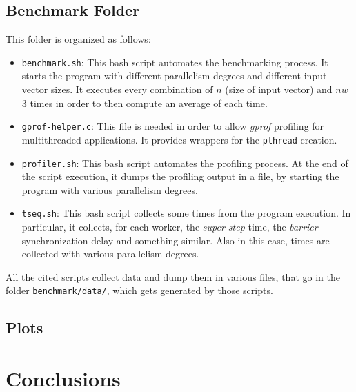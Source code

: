 \documentclass[]{article}
\def\code#1{\texttt{#1}}
\begin{document}
\subsection{Benchmark Folder}
\label{sec:benchFold}
This folder is organized as follows:
\begin{itemize}
	\item \code{benchmark.sh}: This bash script automates the benchmarking process. It starts the program with different parallelism degrees and different input vector sizes. It executes every combination of $n$ (size of input vector) and $\mathit{nw}$ 3 times in order to then compute an average of each time.
	\item \code{gprof-helper.c}: This file is needed in order to allow \emph{gprof} profiling for multithreaded applications. It provides wrappers for the \code{pthread} creation.
	\item \code{profiler.sh}: This bash script automates the profiling process. At the end of the script execution, it dumps the profiling output in a file, by starting the program with various parallelism degrees.
	\item \code{tseq.sh}: This bash script collects some times from the program execution. In particular, it collects, for each worker, the \emph{super step} time, the \emph{barrier} synchronization delay and something similar. Also in this case, times are collected with various parallelism degrees.
\end{itemize}
All the cited scripts collect data and dump them in various files, that go in the folder \code{benchmark/data/}, which gets generated by those scripts.

\subsection{Plots}
\label{sec:plots}

\section{Conclusions}
\label{sec:conclusion}
\end{document}
